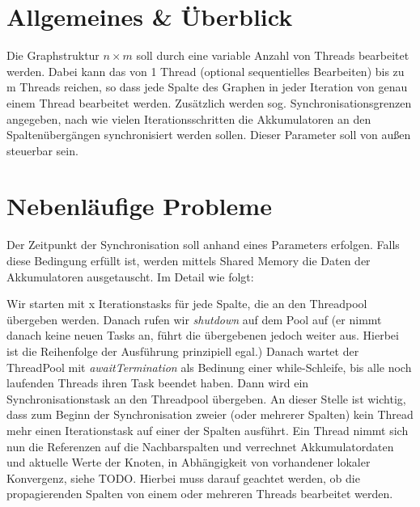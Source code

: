 
\usepackage{pdfpages}
\usepackage{listings}



\newcommand{\subttl}{\textbf{Milestone 1}}
\newcommand{\StudNameOne}{Christoph Rosenhauer (2549220)}
\newcommand{\StudNameTwo}{Lukas Schaal (2539218)}
\newcommand{\StudNameThree}{Jens Heinen (2542182)}


\section{Allgemeines \& Überblick}
Die Graphstruktur $n \times m$ soll durch eine variable Anzahl von Threads bearbeitet werden. Dabei kann das von 1 Thread (optional sequentielles Bearbeiten) bis zu m Threads reichen, so dass jede Spalte des Graphen in jeder Iteration von genau einem Thread bearbeitet werden. 
Zusätzlich werden sog. Synchronisationsgrenzen  angegeben, nach wie vielen Iterationsschritten die Akkumulatoren an den Spaltenübergängen synchronisiert werden sollen. Dieser Parameter soll von außen steuerbar sein. 

\section{Nebenläufige Probleme}
Der Zeitpunkt der Synchronisation soll anhand eines Parameters erfolgen. Falls diese Bedingung erfüllt ist, werden mittels Shared Memory die Daten der Akkumulatoren ausgetauscht. Im Detail wie folgt:

Wir starten mit x Iterationstasks für jede Spalte, die an den Threadpool übergeben werden. Danach rufen wir \textit{shutdown}  auf dem Pool auf (er nimmt danach keine neuen Tasks an, führt die übergebenen jedoch weiter aus. Hierbei ist die Reihenfolge der Ausführung prinzipiell egal.) Danach wartet der ThreadPool mit \textit{awaitTermination} als Bedinung einer while-Schleife, bis alle noch laufenden Threads ihren Task beendet haben.
Dann wird ein Synchronisationstask an den Threadpool übergeben. An dieser Stelle ist wichtig, dass zum Beginn der Synchronisation zweier (oder mehrerer Spalten) kein Thread mehr einen Iterationstask auf einer der Spalten ausführt. Ein Thread nimmt sich nun die Referenzen auf die Nachbarspalten und verrechnet Akkumulatordaten und aktuelle Werte der Knoten, in Abhängigkeit von vorhandener lokaler Konvergenz, siehe TODO. Hierbei muss darauf geachtet werden, ob die propagierenden Spalten von einem oder mehreren Threads bearbeitet werden.

